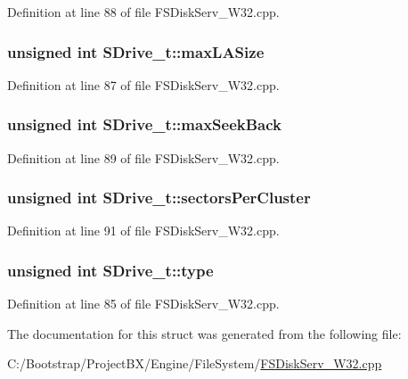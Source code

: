 Definition at line 88 of file FSDiskServ\_\-W32.cpp.\hypertarget{struct_s_drive__t_82bfb5892551f2b4ae7d1bfea9fd16bb}{
\subsubsection[{maxLASize}]{\setlength{\rightskip}{0pt plus 5cm}unsigned int {\bf SDrive\_\-t::maxLASize}}}
\label{struct_s_drive__t_82bfb5892551f2b4ae7d1bfea9fd16bb}




Definition at line 87 of file FSDiskServ\_\-W32.cpp.\hypertarget{struct_s_drive__t_53e9e2a8c991d51eb458b07fb96b4620}{
\subsubsection[{maxSeekBack}]{\setlength{\rightskip}{0pt plus 5cm}unsigned int {\bf SDrive\_\-t::maxSeekBack}}}
\label{struct_s_drive__t_53e9e2a8c991d51eb458b07fb96b4620}




Definition at line 89 of file FSDiskServ\_\-W32.cpp.\hypertarget{struct_s_drive__t_840f05d50889266ea6de3979fa0425be}{
\subsubsection[{sectorsPerCluster}]{\setlength{\rightskip}{0pt plus 5cm}unsigned int {\bf SDrive\_\-t::sectorsPerCluster}}}
\label{struct_s_drive__t_840f05d50889266ea6de3979fa0425be}




Definition at line 91 of file FSDiskServ\_\-W32.cpp.\hypertarget{struct_s_drive__t_c7f17137b18a64a3729c24790f263eb9}{
\subsubsection[{type}]{\setlength{\rightskip}{0pt plus 5cm}unsigned int {\bf SDrive\_\-t::type}}}
\label{struct_s_drive__t_c7f17137b18a64a3729c24790f263eb9}




Definition at line 85 of file FSDiskServ\_\-W32.cpp.

The documentation for this struct was generated from the following file:\begin{CompactItemize}
\item 
C:/Bootstrap/ProjectBX/Engine/FileSystem/\hyperlink{_f_s_disk_serv___w32_8cpp}{FSDiskServ\_\-W32.cpp}\end{CompactItemize}
